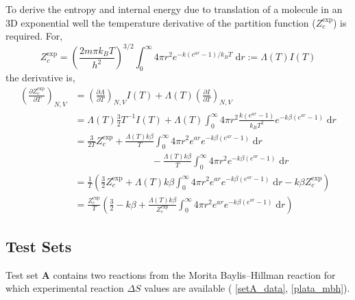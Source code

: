 \documentclass[../main.tex]{subfiles}
\begin{document}
To derive the entropy and internal energy due to translation of a molecule in an 3D exponential well the temperature derivative of the partition function ($Z_c^\text{exp}$) is required. For,
\begin{equation}
	Z_c^\text{exp} =\left(\frac{2m\pi k_B T}{h^2} \right)^{3/2} \int_0^\infty 4\pi r^2 e^{- k(e^{ar} - 1) / k_B T} \; \text{d}r :=  \Lambda(T) I(T)
\end{equation}
the derivative is,
\begin{equation}
	\begin{aligned}
		\left(\frac{\partial Z_c^\text{exp}}{\partial T}\right)_{N , V} &= \left(\frac{\partial \Lambda}{\partial T}\right)_{N , V} I(T) + \Lambda(T)\left(\frac{\partial I}{\partial T}\right)_{N , V} \\
		&= \Lambda(T) \frac{3}{2}T^{-1} I(T) + \Lambda(T) \int_0^\infty 4\pi r^2 \frac{k(e^{ar} - 1)}{k_B T^2}  e^{- k\beta (e^{ar} - 1)} \; \text{d}r \\
		&= \frac{3}{2T} Z_c^\text{exp} + \frac{\Lambda(T) k\beta}{T} \int_0^\infty 4\pi r^2 e^{ar}  e^{- k\beta(e^{ar} - 1)} \; \text{d}r \\
		&\qquad\qquad\qquad\qquad-  \frac{\Lambda(T) k\beta}{T}  \int_0^\infty 4\pi r^2 e^{- k\beta(e^{ar} - 1)} \; \text{d}r \\
		&= \frac{1}{T} \left(  \frac{3}{2} Z_c^\text{exp} + \Lambda(T) k\beta \int_0^\infty 4\pi r^2 e^{ar}  e^{- k\beta(e^{ar} - 1)} \; \text{d}r -  k\beta Z_c^\text{exp} \right) \\
		&= \frac{Z_c^\text{exp}}{T} \left( \frac{3}{2} - k\beta + \frac{\Lambda(T) k\beta}{Z_c^\text{exp}} \int_0^\infty 4\pi r^2 e^{ar}  e^{- k\beta(e^{ar} - 1)} \; \text{d}r
		\right)
	\end{aligned}
\end{equation}





\clearpage
\subsection{Test Sets} \label{section::appendix_entropy_test_cases}

Test set {\bfseries{A}} contains two reactions from the Morita Baylis--Hillman reaction for which experimental reaction $\Delta S$ values are available (\tablename{ \ref{setA_data}}, \figurename{ \ref{plata_mbh}}).\cite{Plata2015}
\end{document}

